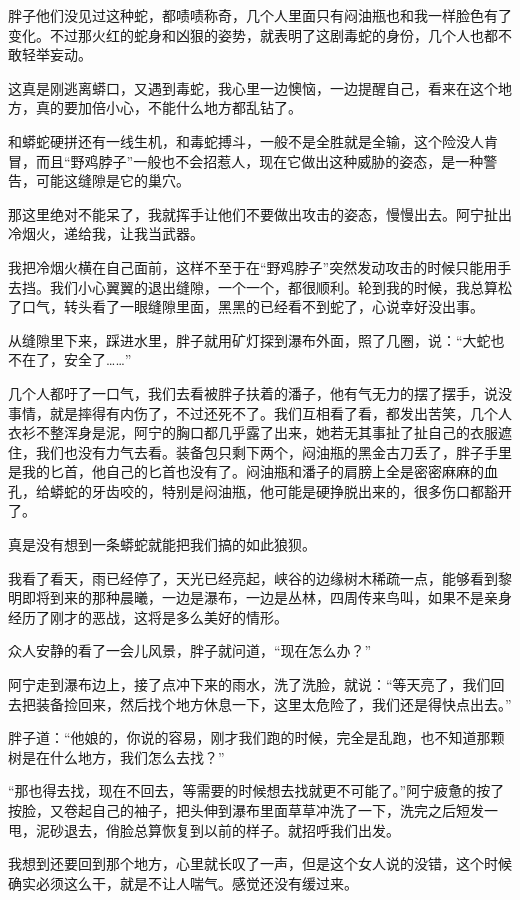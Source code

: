 胖子他们没见过这种蛇，都啧啧称奇，几个人里面只有闷油瓶也和我一样脸色有了变化。不过那火红的蛇身和凶狠的姿势，就表明了这剧毒蛇的身份，几个人也都不敢轻举妄动。

这真是刚逃离蟒口，又遇到毒蛇，我心里一边懊恼，一边提醒自己，看来在这个地方，真的要加倍小心，不能什么地方都乱钻了。

和蟒蛇硬拼还有一线生机，和毒蛇搏斗，一般不是全胜就是全输，这个险没人肯冒，而且“野鸡脖子”一般也不会招惹人，现在它做出这种威胁的姿态，是一种警告，可能这缝隙是它的巢穴。

那这里绝对不能呆了，我就挥手让他们不要做出攻击的姿态，慢慢出去。阿宁扯出冷烟火，递给我，让我当武器。

我把冷烟火横在自己面前，这样不至于在“野鸡脖子”突然发动攻击的时候只能用手去挡。我们小心翼翼的退出缝隙，一个一个，都很顺利。轮到我的时候，我总算松了口气，转头看了一眼缝隙里面，黑黑的已经看不到蛇了，心说幸好没出事。

从缝隙里下来，踩进水里，胖子就用矿灯探到瀑布外面，照了几圈，说：“大蛇也不在了，安全了……”

几个人都吁了一口气，我们去看被胖子扶着的潘子，他有气无力的摆了摆手，说没事情，就是摔得有内伤了，不过还死不了。我们互相看了看，都发出苦笑，几个人衣衫不整浑身是泥，阿宁的胸口都几乎露了出来，她若无其事扯了扯自己的衣服遮住，我们也没有力气去看。装备包只剩下两个，闷油瓶的黑金古刀丢了，胖子手里是我的匕首，他自己的匕首也没有了。闷油瓶和潘子的肩膀上全是密密麻麻的血孔，给蟒蛇的牙齿咬的，特别是闷油瓶，他可能是硬挣脱出来的，很多伤口都豁开了。

真是没有想到一条蟒蛇就能把我们搞的如此狼狈。

我看了看天，雨已经停了，天光已经亮起，峡谷的边缘树木稀疏一点，能够看到黎明即将到来的那种晨曦，一边是瀑布，一边是丛林，四周传来鸟叫，如果不是亲身经历了刚才的恶战，这将是多么美好的情形。

众人安静的看了一会儿风景，胖子就问道，“现在怎么办？”

阿宁走到瀑布边上，接了点冲下来的雨水，洗了洗脸，就说：“等天亮了，我们回去把装备捡回来，然后找个地方休息一下，这里太危险了，我们还是得快点出去。”

胖子道：“他娘的，你说的容易，刚才我们跑的时候，完全是乱跑，也不知道那颗树是在什么地方，我们怎么去找？”

“那也得去找，现在不回去，等需要的时候想去找就更不可能了。”阿宁疲惫的按了按脸，又卷起自己的袖子，把头伸到瀑布里面草草冲洗了一下，洗完之后短发一甩，泥砂退去，俏脸总算恢复到以前的样子。就招呼我们出发。

我想到还要回到那个地方，心里就长叹了一声，但是这个女人说的没错，这个时候确实必须这么干，就是不让人喘气。感觉还没有缓过来。

